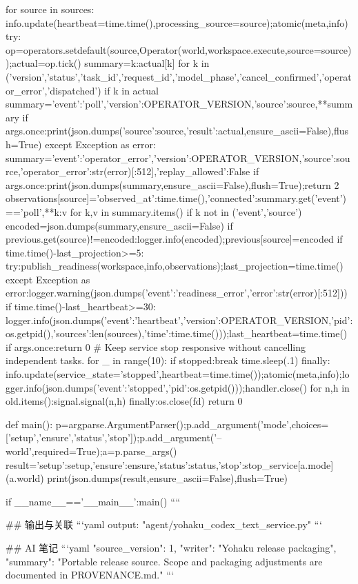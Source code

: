                 for source in sources:
                    info.update(heartbeat=time.time(),processing_source=source);atomic(meta,info)
                    try:
                        op=operators.setdefault(source,Operator(world,workspace.execute,source=source));actual=op.tick()
                        summary={k:actual[k] for k in ('version','status','task_id','request_id','model_phase','cancel_confirmed','operator_error','dispatched') if k in actual}
                        summary={'event':'poll','version':OPERATOR_VERSION,'source':source,**summary}
                        if args.once:print(json.dumps({'source':source,'result':actual},ensure_ascii=False),flush=True)
                    except Exception as error:
                        summary={'event':'operator_error','version':OPERATOR_VERSION,'source':source,'operator_error':str(error)[:512],'replay_allowed':False}
                        if args.once:print(json.dumps(summary,ensure_ascii=False),flush=True);return 2
                    observations[source]={'observed_at':time.time(),'connected':summary.get('event')=='poll',**{k:v for k,v in summary.items() if k not in ('event','source')}}
                    encoded=json.dumps(summary,ensure_ascii=False)
                    if previous.get(source)!=encoded:logger.info(encoded);previous[source]=encoded
                if time.time()-last_projection>=5:
                    try:publish_readiness(workspace,info,observations);last_projection=time.time()
                    except Exception as error:logger.warning(json.dumps({'event':'readiness_error','error':str(error)[:512]}))
                if time.time()-last_heartbeat>=30:
                    logger.info(json.dumps({'event':'heartbeat','version':OPERATOR_VERSION,'pid':os.getpid(),'sources':len(sources),'time':time.time()}));last_heartbeat=time.time()
                if args.once:return 0
                # Keep service stop responsive without cancelling independent tasks.
                for _ in range(10):
                    if stopped:break
                    time.sleep(.1)
        finally:
            info.update(service_state='stopped',heartbeat=time.time());atomic(meta,info);logger.info(json.dumps({'event':'stopped','pid':os.getpid()}));handler.close()
            for n,h in old.items():signal.signal(n,h)
    finally:os.close(fd)
    return 0

def main():
    p=argparse.ArgumentParser();p.add_argument('mode',choices=['setup','ensure','status','stop']);p.add_argument('--world',required=True);a=p.parse_args()
    result={'setup':setup,'ensure':ensure,'status':status,'stop':stop_service}[a.mode](a.world)
    print(json.dumps(result,ensure_ascii=False),flush=True)

if __name__=='__main__':main()
````

## 输出与关联
```yaml
output: "agent/yohaku_codex_text_service.py"
```

## AI 笔记
```yaml
{"source_version": 1, "writer": "Yohaku release packaging", "summary": "Portable release source. Scope and packaging adjustments are documented in PROVENANCE.md."}
```
